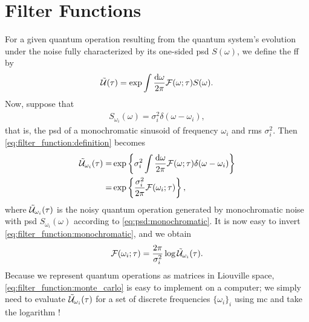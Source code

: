 \chapter{Filter Functions}\label{ch:filter_functions}
For a {\color{RWTHmagenta75} given} quantum operation \liouvUe resulting from the quantum system's evolution under the noise fully characterized by its one-sided \gls{psd} $S(\omega)$, we define the \gls{ff} \FF by
\begin{align}
    \label{eq:filter_function:definition}
    \mathcal{\tilde{U}}(\tau) = \exp\int\frac{\dd{\omega}}{2\pi}\mathcal{F}(\omega;\tau) S(\omega).
\end{align}
Now, suppose that
\begin{align}
    \label{eq:psd:monochromatic}
    S_{\omega_i}(\omega) = \sigma_i^2 \delta(\omega - \omega_i), %
\end{align}
that is, the \gls{psd} of a monochromatic sinusoid of frequency $\omega_i$ and \gls{rms} $\sigma_i^2$.
Then \cref{eq:filter_function:definition} becomes
\begin{equation}
    \label{eq:filter_function:monochromatic}
    \begin{split}
        \mathcal{\tilde{U}}_{\omega_i}(\tau) =& \exp\left\lbrace\sigma_i^2\int\frac{\dd{\omega}}{2\pi}\mathcal{F}(\omega;\tau)\delta(\omega - \omega_i)\right\rbrace \\
                                  =& \exp\left\lbrace\frac{\sigma_i^2}{2\pi}\mathcal{F}(\omega_i;\tau)\right\rbrace,
    \end{split}
\end{equation}
where $\mathcal{\tilde{U}}_{\omega_i}(\tau)$ is the noisy quantum operation generated by monochromatic noise with \gls{psd} $S_{\omega_i}(\omega)$ according to \cref{eq:psd:monochromatic}.
It is now easy to invert \cref{eq:filter_function:monochromatic}, and we obtain
\begin{align}
    \label{eq:filter_function:monte_carlo}
    \mathcal{F}(\omega_i; \tau) = \frac{2\pi}{\sigma_i^2}\log\mathcal{\tilde{U}}_{\omega_i}(\tau).
\end{align}
Because we represent quantum operations as matrices in Liouville space, \cref{eq:filter_function:monte_carlo} is easy to implement on a computer; we simply need to evaluate $\mathcal{\tilde{U}}_{\omega_i}(\tau)$ for a set of discrete frequencies $\lbrace\omega_i\rbrace_i$ using \gls{mc} and take the logarithm !

